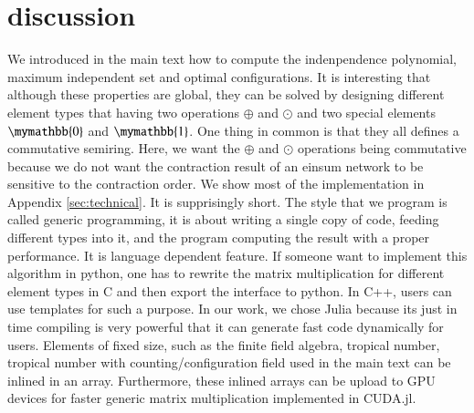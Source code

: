 \documentclass{article}
\newcommand{\<}{\langle}
\renewcommand{\>}{\rangle}
\theoremstyle{definition}\newtheorem{definition}{\textit{Definition}}
\begin{document}
\section{discussion}
We introduced in the main text how to compute the indenpendence polynomial, maximum independent set and optimal configurations.
It is interesting that although these properties are global,
they can be solved by designing different element types that having two operations $\oplus$ and $\odot$ and two special elements $\mymathbb{0}$ and $\mymathbb{1}$.
One thing in common is that they all defines a commutative semiring.
Here, we want the $\oplus$ and $\odot$ operations being commutative because we do not want the contraction result of an einsum network to be sensitive to the contraction order.
We show most of the implementation in Appendix \ref{sec:technical}. It is supprisingly short.
The style that we program is called generic programming,
it is about writing a single copy of code, feeding different types into it, and the program computing the result with a proper performance.
It is language dependent feature. If someone want to implement this algorithm in python,
one has to rewrite the matrix multiplication for different element types in C and then export the interface to python.
In C++, users can use templates for such a purpose.
In our work, we chose Julia because its just in time compiling is very powerful that it can generate fast code dynamically for users.
Elements of fixed size, such as the finite field algebra, tropical number, tropical number with counting/configuration field used in the main text can be inlined in an array.
Furthermore, these inlined arrays can be upload to GPU devices for faster generic matrix multiplication implemented in CUDA.jl.
\end{document}
